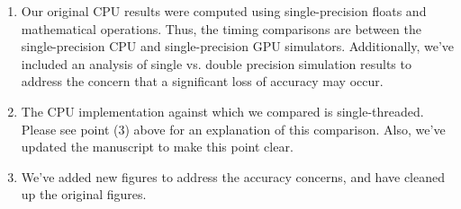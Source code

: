 \documentclass[10pt]{article}
\begin{document}
\begin{enumerate}

\item Our original CPU results were computed using
  single-precision floats and mathematical operations.  Thus, the
  timing comparisons are between the single-precision CPU and
  single-precision GPU simulators. Additionally, we've included an
  analysis of single vs. double precision simulation results to
  address the concern that a significant loss of accuracy may occur.

\item The CPU implementation against which we compared is
  single-threaded.  Please see point (3) above for an explanation of
  this comparison.  Also, we've updated the manuscript to make this
  point clear.

\item We've added new figures to address the accuracy concerns, and
  have cleaned up the original figures.

\end{enumerate}
\end{document}
